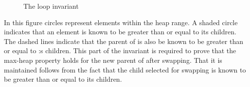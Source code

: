 \documentclass[english,submission]{eptcs}
\begin{document}
\begin{figure}[h]
\begin{centering}
\par\end{centering}

\caption{The  loop invariant \label{fig:Siftdown-loop}}
\end{figure}
 In this figure circles represent elements within the heap range.
A shaded circle indicates that an element is known to be greater than
or equal to its children. The dashed lines indicate that the parent
of  is also be known to be greater than or equal to :s
children. This part of the invariant is required to prove that the
max-heap property holds for the new parent of  after
swapping. That it is maintained follows from the fact that the child
selected for swapping is known to be greater than or equal to its
children.
\end{document}
